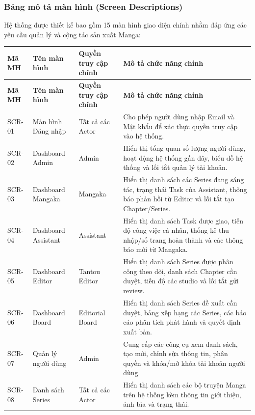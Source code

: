 \subsubsection{Bảng mô tả màn hình (Screen Descriptions)}
Hệ thống được thiết kế bao gồm 15 màn hình giao diện chính nhằm đáp ứng các yêu cầu quản lý và cộng tác sản xuất Manga:

\begin{longtable}{|p{1.5cm}|p{3.5cm}|p{3.0cm}|p{6.5cm}|}
    \hline
    \rowcolor{tableheader}
    \textbf{Mã MH} & \textbf{Tên màn hình} & \textbf{Quyền truy cập chính} & \textbf{Mô tả chức năng chính} \rule[-1.2ex]{0pt}{4ex} \\ \hline
    \endfirsthead
    \hline
    \rowcolor{tableheader}
    \textbf{Mã MH} & \textbf{Tên màn hình} & \textbf{Quyền truy cập chính} & \textbf{Mô tả chức năng chính} \rule[-1.2ex]{0pt}{4ex} \\ \hline
    \endhead
    SCR-01 & Màn hình Đăng nhập & Tất cả các Actor & Cho phép người dùng nhập Email và Mật khẩu để xác thực quyền truy cập vào hệ thống. \\ \hline
    SCR-02 & Dashboard Admin & Admin & Hiển thị tổng quan số lượng người dùng, hoạt động hệ thống gần đây, biểu đồ hệ thống và lối tắt quản lý tài khoản. \\ \hline
    SCR-03 & Dashboard Mangaka & Mangaka & Hiển thị danh sách các Series đang sáng tác, trạng thái Task của Assistant, thông báo phản hồi từ Editor và lối tắt tạo Chapter/Series. \\ \hline
    SCR-04 & Dashboard Assistant & Assistant & Hiển thị danh sách Task được giao, tiến độ công việc cá nhân, thống kê thu nhập/số trang hoàn thành và các thông báo mới từ Mangaka. \\ \hline
    SCR-05 & Dashboard Editor & Tantou Editor & Hiển thị danh sách Series được phân công theo dõi, danh sách Chapter cần duyệt, tiến độ các studio và lối tắt gửi review. \\ \hline
    SCR-06 & Dashboard Board & Editorial Board & Hiển thị danh sách Series đề xuất cần duyệt, bảng xếp hạng các Series, các báo cáo phân tích phát hành và quyết định xuất bản. \\ \hline
    SCR-07 & Quản lý người dùng & Admin & Cung cấp các công cụ xem danh sách, tạo mới, chỉnh sửa thông tin, phân quyền và khóa/mở khóa tài khoản người dùng. \\ \hline
    SCR-08 & Danh sách Series & Tất cả các Actor & Hiển thị danh sách các bộ truyện Manga trên hệ thống kèm thông tin giới thiệu, ảnh bìa và trạng thái. \\ \hline

\end{longtable}
